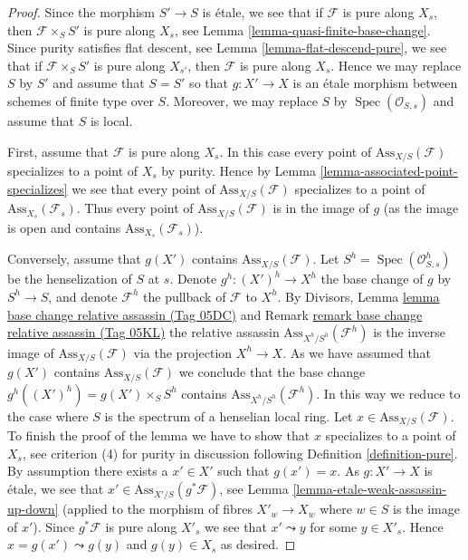 \documentclass{amsart}
\theoremstyle{plain}
\theoremstyle{definition}
\theoremstyle{remark}
\numberwithin{equation}{subsection}
\def\Spec{\mathop{\mathrm{Spec}}}
\begin{document}
\begin{proof}
Since the morphism $S' \to S$ is \'etale, we see that if $\mathcal{F}$
is pure along $X_s$, then $\mathcal{F} \times_S S'$ is pure along
$X_s$, see
Lemma \ref{lemma-quasi-finite-base-change}.
Since purity satisfies flat descent, see
Lemma \ref{lemma-flat-descend-pure},
we see that if $\mathcal{F} \times_S S'$ is pure along $X_{s'}$, then
$\mathcal{F}$ is pure along $X_s$. Hence we may replace $S$ by $S'$
and assume that $S = S'$ so that $g : X' \to X$ is an \'etale morphism
between schemes of finite type over $S$. Moreover, we may replace
$S$ by $\Spec(\mathcal{O}_{S, s})$ and assume that $S$ is local.

\medskip\noindent
First, assume that $\mathcal{F}$ is pure along $X_s$.
In this case every point of $\text{Ass}_{X/S}(\mathcal{F})$
specializes to a point of $X_s$ by purity. Hence by
Lemma \ref{lemma-associated-point-specializes}
we see that every point of $\text{Ass}_{X/S}(\mathcal{F})$
specializes to a point of $\text{Ass}_{X_s}(\mathcal{F}_s)$.
Thus every point of $\text{Ass}_{X/S}(\mathcal{F})$ is in the
image of $g$ (as the image is open and contains
$\text{Ass}_{X_s}(\mathcal{F}_s)$).

\medskip\noindent
Conversely, assume that $g(X')$ contains $\text{Ass}_{X/S}(\mathcal{F})$.
Let $S^h = \Spec(\mathcal{O}_{S, s}^h)$ be the henselization
of $S$ at $s$. Denote $g^h : (X')^h \to X^h$ the base change of $g$
by $S^h \to S$, and denote $\mathcal{F}^h$ the pullback of $\mathcal{F}$
to $X^h$. By
Divisors, Lemma \href{https://stacks.math.columbia.edu/tag/05DC}{lemma base change relative assassin (Tag 05DC)} and
Remark \href{https://stacks.math.columbia.edu/tag/05KL}{remark base change relative assassin (Tag 05KL)}
the relative assassin $\text{Ass}_{X^h/S^h}(\mathcal{F}^h)$
is the inverse image of $\text{Ass}_{X/S}(\mathcal{F})$ via the projection
$X^h \to X$. As we have assumed that $g(X')$ contains
$\text{Ass}_{X/S}(\mathcal{F})$ we conclude that the base change
$g^h((X')^h) = g(X') \times_S S^h$ contains
$\text{Ass}_{X^h/S^h}(\mathcal{F}^h)$. In this way
we reduce to the case where $S$ is the spectrum of a henselian local ring.
Let $x \in \text{Ass}_{X/S}(\mathcal{F})$. To finish the proof of the
lemma we have to show that $x$ specializes to a point of $X_s$, see
criterion (4) for purity in discussion following
Definition \ref{definition-pure}.
By assumption there exists a $x' \in X'$ such that $g(x') = x$.
As $g : X' \to X$ is \'etale, we see that
$x' \in \text{Ass}_{X'/S}(g^*\mathcal{F})$, see
Lemma \ref{lemma-etale-weak-assassin-up-down} (applied to
the morphism of fibres $X'_w \to X_w$ where $w \in S$ is the image of $x'$).
Since $g^*\mathcal{F}$ is pure along $X'_s$ we see that $x' \leadsto y$
for some $y \in X'_s$. Hence $x = g(x') \leadsto g(y)$ and
$g(y) \in X_s$ as desired.
\end{proof}
\end{document}
